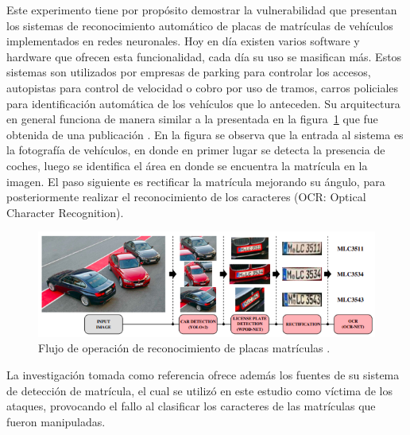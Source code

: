Este experimento tiene por propósito demostrar la vulnerabilidad que presentan los sistemas de reconocimiento automático de placas de matrículas de vehículos implementados en redes neuronales. Hoy en día existen varios software y hardware que ofrecen esta funcionalidad, cada día su uso se masifican más. Estos sistemas son utilizados por empresas de parking para controlar los accesos, autopistas para control de velocidad o cobro por uso de tramos, carros policiales para identificación automática de los vehículos que lo anteceden. Su arquitectura en general funciona de manera similar a la presentada en la figura~\ref{fig:51} que fue obtenida de una publicación \parencite{r60}. En la figura se observa que la entrada al sistema es la fotografía de vehículos,  en donde en primer lugar se detecta la presencia de coches, luego se identifica el área en donde se encuentra la matrícula en la imagen. El paso siguiente es rectificar la matrícula mejorando su ángulo, para posteriormente realizar el reconocimiento de los caracteres (OCR: Optical Character Recognition).

\begin{figure}[!h]
\centering
\includegraphics[scale = 0.90]{Figures/figura_51.PNG}
\decoRule
\caption[Flujo de operación de reconocimiento de placas matrículas]{Flujo de operación de reconocimiento de placas matrículas \parencite{r60}.}
\label{fig:51}
\end{figure}

La investigación tomada como referencia \parencite{r60} ofrece además los fuentes de su sistema de detección de matrícula, el cual se utilizó en este estudio como víctima de los ataques, provocando el fallo al clasificar los caracteres de las matrículas que fueron manipuladas.

